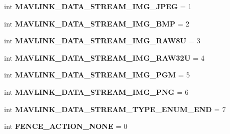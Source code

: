\begin{DoxyCompactItemize}
\mbox{\label{namespacepymavlink_1_1dialects_1_1v10_a38d36fee33e741a23260d4df24089c84}} 
int {\bfseries M\+A\+V\+L\+I\+N\+K\+\_\+\+D\+A\+T\+A\+\_\+\+S\+T\+R\+E\+A\+M\+\_\+\+I\+M\+G\+\_\+\+J\+P\+EG} = 1
\item 
\mbox{\label{namespacepymavlink_1_1dialects_1_1v10_aa6fb03e94d0875ca7faa0e07ae4b9b07}} 
int {\bfseries M\+A\+V\+L\+I\+N\+K\+\_\+\+D\+A\+T\+A\+\_\+\+S\+T\+R\+E\+A\+M\+\_\+\+I\+M\+G\+\_\+\+B\+MP} = 2
\item 
\mbox{\label{namespacepymavlink_1_1dialects_1_1v10_a4c73198b4d5e7cb07633ec1393c7532a}} 
int {\bfseries M\+A\+V\+L\+I\+N\+K\+\_\+\+D\+A\+T\+A\+\_\+\+S\+T\+R\+E\+A\+M\+\_\+\+I\+M\+G\+\_\+\+R\+A\+W8U} = 3
\item 
\mbox{\label{namespacepymavlink_1_1dialects_1_1v10_af506915ffbeb89484753c4b613887139}} 
int {\bfseries M\+A\+V\+L\+I\+N\+K\+\_\+\+D\+A\+T\+A\+\_\+\+S\+T\+R\+E\+A\+M\+\_\+\+I\+M\+G\+\_\+\+R\+A\+W32U} = 4
\item 
\mbox{\label{namespacepymavlink_1_1dialects_1_1v10_aafdd52b2dc73ec111bc62d490db527d7}} 
int {\bfseries M\+A\+V\+L\+I\+N\+K\+\_\+\+D\+A\+T\+A\+\_\+\+S\+T\+R\+E\+A\+M\+\_\+\+I\+M\+G\+\_\+\+P\+GM} = 5
\item 
\mbox{\label{namespacepymavlink_1_1dialects_1_1v10_ad75cf87c21385e792ca3c4ef55ccedb8}} 
int {\bfseries M\+A\+V\+L\+I\+N\+K\+\_\+\+D\+A\+T\+A\+\_\+\+S\+T\+R\+E\+A\+M\+\_\+\+I\+M\+G\+\_\+\+P\+NG} = 6
\item 
\mbox{\label{namespacepymavlink_1_1dialects_1_1v10_a700b48d7f239a3bf57febc28a7ce9031}} 
int {\bfseries M\+A\+V\+L\+I\+N\+K\+\_\+\+D\+A\+T\+A\+\_\+\+S\+T\+R\+E\+A\+M\+\_\+\+T\+Y\+P\+E\+\_\+\+E\+N\+U\+M\+\_\+\+E\+ND} = 7
\item 
\mbox{\label{namespacepymavlink_1_1dialects_1_1v10_a795b6ec45c540658463af413f0b74946}} 
int {\bfseries F\+E\+N\+C\+E\+\_\+\+A\+C\+T\+I\+O\+N\+\_\+\+N\+O\+NE} = 0
\item 

\end{DoxyCompactItemize}
